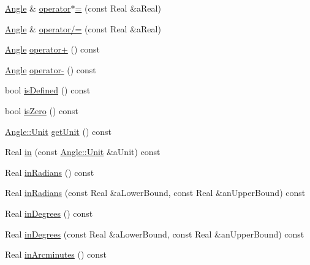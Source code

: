 \begin{DoxyCompactItemize}
\item 
\hyperlink{classostk_1_1math_1_1geom_1_1_angle}{Angle} \& \hyperlink{classostk_1_1math_1_1geom_1_1_angle_a1678d49f97ffd518275ef6e8427bd8d8}{operator$\ast$=} (const Real \&a\+Real)
\item 
\hyperlink{classostk_1_1math_1_1geom_1_1_angle}{Angle} \& \hyperlink{classostk_1_1math_1_1geom_1_1_angle_a4c3cc143bee84c4e6f4026334c77715e}{operator/=} (const Real \&a\+Real)
\item 
\hyperlink{classostk_1_1math_1_1geom_1_1_angle}{Angle} \hyperlink{classostk_1_1math_1_1geom_1_1_angle_a082673bbfc73cc1f9c6168f8013872fe}{operator+} () const
\item 
\hyperlink{classostk_1_1math_1_1geom_1_1_angle}{Angle} \hyperlink{classostk_1_1math_1_1geom_1_1_angle_ac1f4386571a0441ce35adc02af5adbd4}{operator-\/} () const
\item 
bool \hyperlink{classostk_1_1math_1_1geom_1_1_angle_a7b36ed6d5a639becac52b7d671abd081}{is\+Defined} () const
\item 
bool \hyperlink{classostk_1_1math_1_1geom_1_1_angle_a6d0d595cd1f0dc8faceb61d1effd62ff}{is\+Zero} () const
\item 
\hyperlink{classostk_1_1math_1_1geom_1_1_angle_abb73526d3f7f94a3b33e8358e1b18027}{Angle\+::\+Unit} \hyperlink{classostk_1_1math_1_1geom_1_1_angle_ac00b6e24c10e4880a2d76a25f8e49095}{get\+Unit} () const
\item 
Real \hyperlink{classostk_1_1math_1_1geom_1_1_angle_af7c5cff42aec2b9ccd6c246974df5d0c}{in} (const \hyperlink{classostk_1_1math_1_1geom_1_1_angle_abb73526d3f7f94a3b33e8358e1b18027}{Angle\+::\+Unit} \&a\+Unit) const
\item 
Real \hyperlink{classostk_1_1math_1_1geom_1_1_angle_a0426a02c8e5c6a61fd39a0432519f0be}{in\+Radians} () const
\item 
Real \hyperlink{classostk_1_1math_1_1geom_1_1_angle_a26137d8637df2bde3b63db1c0ad80702}{in\+Radians} (const Real \&a\+Lower\+Bound, const Real \&an\+Upper\+Bound) const
\item 
Real \hyperlink{classostk_1_1math_1_1geom_1_1_angle_a3385917dba3048600f12f67f5eae5501}{in\+Degrees} () const
\item 
Real \hyperlink{classostk_1_1math_1_1geom_1_1_angle_a6e6c6011eb136c9d7159f5e19c5604ad}{in\+Degrees} (const Real \&a\+Lower\+Bound, const Real \&an\+Upper\+Bound) const
\item 
Real \hyperlink{classostk_1_1math_1_1geom_1_1_angle_a1b09ede16fa16a914029e588166d9b15}{in\+Arcminutes} () const
\item 

\end{DoxyCompactItemize}
